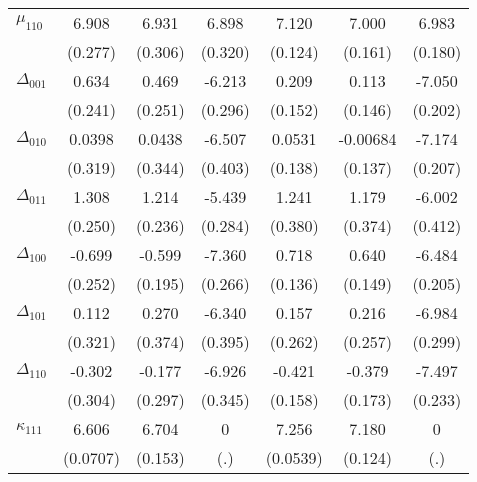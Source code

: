 {\begin{tabular}{l*{6}{c}}
$\mu_{110}$&    6.908\sym{***}&    6.931\sym{***}&    6.898\sym{***}&    7.120\sym{***}&    7.000\sym{***}&    6.983\sym{***}\\
          &  (0.277)         &  (0.306)         &  (0.320)         &  (0.124)         &  (0.161)         &  (0.180)         \\
$\Delta_{001}$&    0.634\sym{***}&    0.469\sym{*}  &   -6.213\sym{***}&    0.209         &    0.113         &   -7.050\sym{***}\\
          &  (0.241)         &  (0.251)         &  (0.296)         &  (0.152)         &  (0.146)         &  (0.202)         \\
$\Delta_{010}$&   0.0398         &   0.0438         &   -6.507\sym{***}&   0.0531         & -0.00684         &   -7.174\sym{***}\\
          &  (0.319)         &  (0.344)         &  (0.403)         &  (0.138)         &  (0.137)         &  (0.207)         \\
$\Delta_{011}$&    1.308\sym{***}&    1.214\sym{***}&   -5.439\sym{***}&    1.241\sym{***}&    1.179\sym{***}&   -6.002\sym{***}\\
          &  (0.250)         &  (0.236)         &  (0.284)         &  (0.380)         &  (0.374)         &  (0.412)         \\
$\Delta_{100}$&   -0.699\sym{***}&   -0.599\sym{***}&   -7.360\sym{***}&    0.718\sym{***}&    0.640\sym{***}&   -6.484\sym{***}\\
          &  (0.252)         &  (0.195)         &  (0.266)         &  (0.136)         &  (0.149)         &  (0.205)         \\
$\Delta_{101}$&    0.112         &    0.270         &   -6.340\sym{***}&    0.157         &    0.216         &   -6.984\sym{***}\\
          &  (0.321)         &  (0.374)         &  (0.395)         &  (0.262)         &  (0.257)         &  (0.299)         \\
$\Delta_{110}$&   -0.302         &   -0.177         &   -6.926\sym{***}&   -0.421\sym{***}&   -0.379\sym{**} &   -7.497\sym{***}\\
          &  (0.304)         &  (0.297)         &  (0.345)         &  (0.158)         &  (0.173)         &  (0.233)         \\
$\kappa_{111}$&    6.606\sym{***}&    6.704\sym{***}&        0         &    7.256\sym{***}&    7.180\sym{***}&        0         \\
          & (0.0707)         &  (0.153)         &      (.)         & (0.0539)         &  (0.124)         &      (.)         \\

\end{tabular}}
